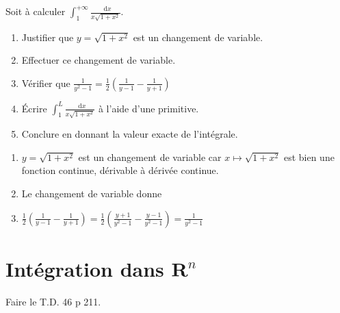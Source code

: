 \documentclass[11pt,a4paper,french]{article}
\newcommand{\R}{\mathbf{R}}
\newcommand{\diff}{\mathop{}\mathopen{}\mathrm{d}}
\theoremstyle{break}
\theoremstyle{plain}
\theoremstyle{nonumberplain}
\theoremstyle{nonumberbreak}
\begin{document}
\begin{question}
  Soit à calculer $\int_1^{+\infty} \frac{\diff x}{x\sqrt{1+x^2}}$.

  \begin{enumerate}
    \item Justifier que $y = \sqrt{1 + x^2}$ est un changement de
      variable.
    \item Effectuer ce changement de variable.
    \item Vérifier que $\frac1{y^2 - 1} = \frac12 \left(\frac1{y - 1} -
      \frac1{y + 1}\right)$
    \item Écrire $\int_1^L \frac{\diff x}{x\sqrt{1+x^2}}$ à l'aide d'une
      primitive.
    \item Conclure en donnant la valeur exacte de l'intégrale.
  \end{enumerate}
\end{question}
\begin{solution}
  \begin{enumerate}
    \item $y = \sqrt{1 + x^2}$ est un changement de variable car $x
      \mapsto \sqrt{1 + x^2}$ est bien une fonction continue, dérivable
      à dérivée continue.
    \item Le changement de variable donne 
    \item $\frac12 \left(\frac1{y - 1} - \frac1{y + 1}\right) = \frac12
      \left( \frac{y + 1}{y^2 - 1} - \frac{y - 1}{y^2 - 1} \right) =
      \frac1{y^2 - 1}$
  \end{enumerate}
\end{solution}

\section{Intégration dans $\R^n$}

Faire le T.D. 46 p 211.

\pagebreak

\printsolutions
\end{document}

